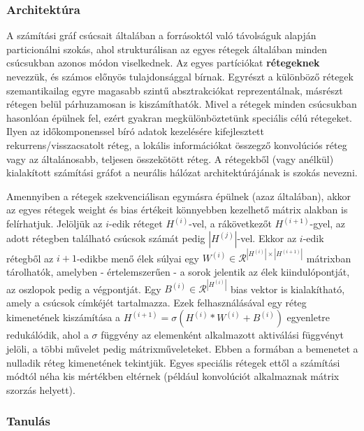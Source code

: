 \subsubsection{Architektúra}

A számítási gráf csúcsait általában a forrásoktól való távolságuk alapján particionálni szokás, ahol strukturálisan az egyes rétegek általában minden csúcsukban azonos módon viselkednek. Az egyes partíciókat \textbf{rétegeknek} nevezzük, és számos előnyös tulajdonsággal bírnak. Egyrészt a különböző rétegek szemantikailag egyre magasabb szintű absztrakciókat reprezentálnak, másrészt rétegen belül párhuzamosan is kiszámíthatók.
Mivel a rétegek minden csúcsukban hasonlóan épülnek fel, ezért gyakran megkülönböztetünk speciális célú rétegeket. Ilyen az időkomponenssel bíró adatok kezelésére kifejlesztett rekurrens/visszacsatolt réteg, a lokális információkat összegző konvolúciós réteg vagy az általánosabb, teljesen összekötött réteg. A rétegekből (vagy anélkül) kialakított számítási gráfot a neurális hálózat architektúrájának is szokás nevezni.


Amennyiben a rétegek szekvenciálisan egymásra épülnek (azaz általában), akkor az egyes rétegek weight és bias értékeit könnyebben kezelhető mátrix alakban is felírhatjuk. Jelöljük az $i$-edik réteget $H^{(i)}$-vel, a rákövetkezőt $H^{(i+1)}$-gyel, az adott rétegben található csúcsok számát pedig $|H^{(j)}|$-vel. Ekkor az $i$-edik rétegből az $i+1$-edikbe menő élek súlyai egy $W^{(i)} \in  \mathcal{R}^{|H^{(i)}|\times|H^{(i+1)}|}$ mátrixban tárolhatók, amelyben - értelemszerűen - a sorok jelentik az élek kiindulópontját, az oszlopok pedig a végpontját. Egy $B^{(i)} \in \mathcal{R}^{|H^{(i)}|}$ bias vektor is kialakítható, amely a csúcsok címkéjét tartalmazza. Ezek felhasználásával egy réteg kimenetének kiszámítása a $H^{(i+1)} = \sigma(H^{(i)} * W^{(i)} + B^{(i)})$ egyenletre redukálódik, ahol a $\sigma$ függvény az elemenként alkalmazott aktiválási függvényt jelöli, a többi művelet pedig mátrixműveleteket. Ebben a formában a bemenetet a nulladik réteg kimenetének tekintjük. Egyes speciális rétegek ettől a számítási módtól néha kis mértékben eltérnek (például konvolúciót alkalmaznak mátrix szorzás helyett).

\subsubsection{Tanulás} \label{NNLearning}

